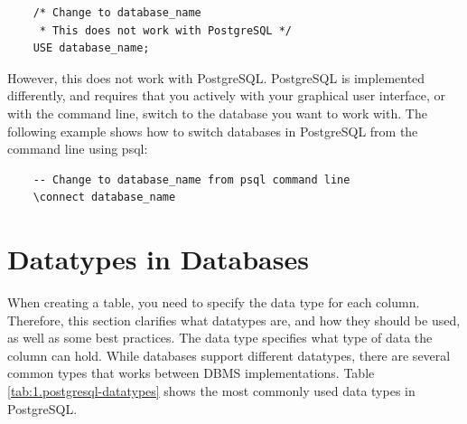 \begin{verbatim}
    /* Change to database_name
     * This does not work with PostgreSQL */
    USE database_name;
\end{verbatim}

However, this does not work with PostgreSQL. PostgreSQL is implemented differently, and requires that you actively with your graphical user interface, or with the command line, switch to the database you want to work with. The following example shows how to switch databases in PostgreSQL from the command line using psql:

\begin{verbatim}
    -- Change to database_name from psql command line
    \connect database_name
\end{verbatim}

\section{Datatypes in Databases}
When creating a table, you need to specify the data type for each column. Therefore, this section clarifies what datatypes are, and how they should be used, as well as some best practices. The data type specifies what type of data the column can hold. While databases support different datatypes, there are several common types that works between DBMS implementations. Table \ref{tab:1.postgresql-datatypes} shows the most commonly used data types in PostgreSQL.

